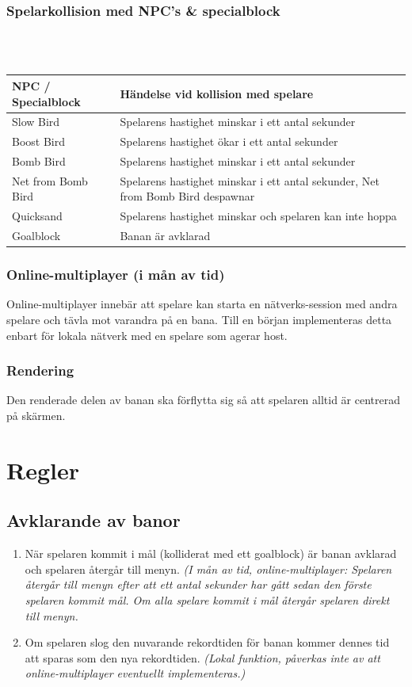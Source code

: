 \documentclass{TDP003mall}
\begin{document}
\subsubsection{Spelarkollision med NPC's \& specialblock}
\\\\
\begin{tabular}{|l|l|}
\hline
\textbf{NPC / Specialblock} & \textbf{Händelse vid kollision med spelare}\\\hline
Slow Bird & Spelarens hastighet minskar i ett antal sekunder\\\hline
Boost Bird & Spelarens hastighet ökar i ett antal sekunder\\\hline
Bomb Bird & Spelarens hastighet minskar i ett antal sekunder\\\hline
Net from Bomb Bird & Spelarens hastighet minskar i ett antal sekunder, Net from Bomb Bird despawnar\\\hline
Quicksand & Spelarens hastighet minskar och spelaren kan inte hoppa \\\hline
Goalblock & Banan är avklarad \\\hline
\end{tabular}

\subsubsection{Online-multiplayer (i mån av tid)}
Online-multiplayer innebär att spelare kan starta en nätverks-session med andra spelare och tävla mot varandra på en bana. Till en början implementeras detta enbart för lokala nätverk med en spelare som agerar host. 

\subsubsection{Rendering}
Den renderade delen av banan ska förflytta sig så att spelaren alltid är centrerad på skärmen.

\newpage

\section{Regler}

\subsection{Avklarande av banor}
\begin{enumerate}
\item När spelaren kommit i mål (kolliderat med ett goalblock) är banan avklarad och spelaren återgår till menyn. \textit{(I mån av tid, online-multiplayer: Spelaren återgår till menyn efter att ett antal sekunder har gått sedan den förste spelaren kommit mål. Om alla spelare kommit i mål återgår spelaren direkt till menyn.}
\item Om spelaren slog den nuvarande rekordtiden för banan kommer dennes tid att sparas som den nya rekordtiden. \textit{(Lokal funktion, påverkas inte av att online-multiplayer eventuellt implementeras.)}
\end{enumerate}
\end{document}
